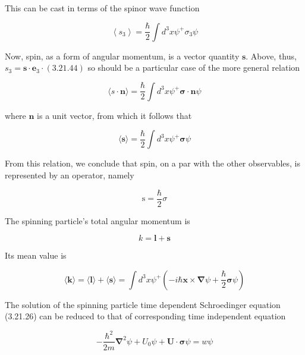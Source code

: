 \documentclass{article}
\begin{document}
This can be cast in terms of the spinor wave function
 
\begin{equation*}
\left\langle s_{3}\right\rangle=\frac{\hbar}{2} \int d^{3} x \psi^{+} \sigma_{3} \psi \tag{3.21.44}
\end{equation*}
 

Now, spin, as a form of angular momentum, is a vector quantity $\boldsymbol{s}$. Above, thus, $s_{3}=\boldsymbol{s} \cdot \boldsymbol{e}_{3} \cdot(3.21 .44)$ so should be a particular case of the more general relation
 
\begin{equation*}
\langle s \cdot \boldsymbol{n}\rangle=\frac{\hbar}{2} \int d^{3} x \psi^{+} \boldsymbol{\sigma} \cdot \boldsymbol{n} \psi \tag{3.21.45}
\end{equation*}
 
where $\boldsymbol{n}$ is a unit vector, from which it follows that
 
\begin{equation*}
\langle\boldsymbol{s}\rangle=\frac{\hbar}{2} \int d^{3} x \psi^{+} \boldsymbol{\sigma} \psi \tag{3.21.46}
\end{equation*}
 

From this relation, we conclude that spin, on a par with the other observables, is represented by an operator, namely
 
\begin{equation*}
\mathrm{s}=\frac{\hbar}{2} \sigma \tag{3.21.47}
\end{equation*}
 

The spinning particle's total angular momentum is
 
\begin{equation*}
k=\boldsymbol{l}+\boldsymbol{s} \tag{3.21.48}
\end{equation*}
 

Its mean value is
 
\begin{equation*}
\langle\boldsymbol{k}\rangle=\langle\boldsymbol{l}\rangle+\langle\boldsymbol{s}\rangle=\int d^{3} x \psi^{+}\left(-i \hbar \boldsymbol{x} \times \boldsymbol{\nabla} \psi+\frac{\hbar}{2} \boldsymbol{\sigma} \psi\right) \tag{3.21.49}
\end{equation*}
 

The solution of the spinning particle time dependent Schroedinger equation (3.21.26) can be reduced to that of corresponding time independent equation
 
\begin{equation*}
-\frac{\hbar^{2}}{2 m} \boldsymbol{\nabla}^{2} \psi+U_{0} \psi+\boldsymbol{U} \cdot \boldsymbol{\sigma} \psi=w \psi \tag{3.21.50}
\end{equation*}
 
\end{document}
